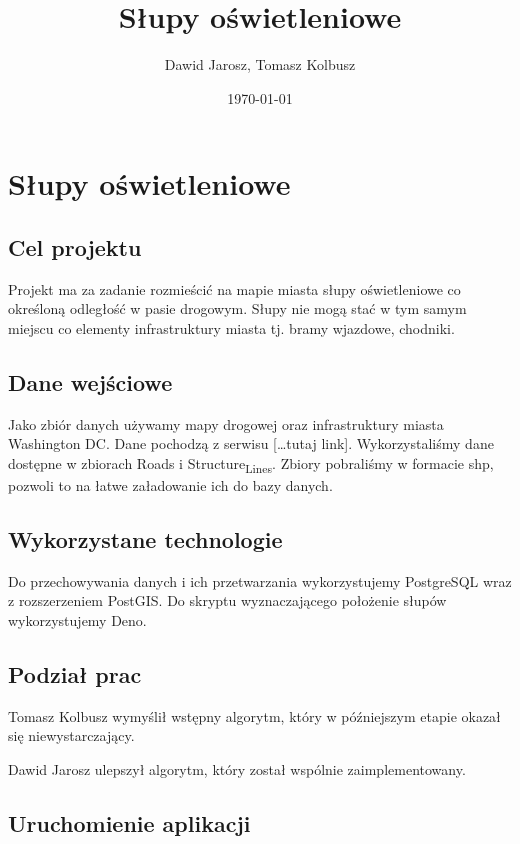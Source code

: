\documentclass[11pt]{article}
\author{Dawid Jarosz, Tomasz Kolbusz}
\date{\today}
\title{Słupy oświetleniowe}
\begin{document}
\maketitle
\tableofcontents


\section{Słupy oświetleniowe}
\label{sec:orgee6b79e}

\subsection{Cel projektu}
\label{sec:org1f6cad9}
Projekt ma za zadanie rozmieścić na mapie miasta słupy oświetleniowe co określoną odległość w pasie drogowym. Słupy nie mogą stać w tym samym miejscu co elementy infrastruktury miasta tj. bramy wjazdowe, chodniki.

\subsection{Dane wejściowe}
\label{sec:org153bbda}

Jako zbiór danych używamy mapy drogowej oraz infrastruktury miasta Washington DC. Dane pochodzą z serwisu [\ldots{}tutaj link]. Wykorzystaliśmy dane dostępne w zbiorach Roads i Structure\textsubscript{Lines}. Zbiory pobraliśmy w formacie shp, pozwoli to na łatwe załadowanie ich do bazy danych.

\subsection{Wykorzystane technologie}
\label{sec:org72fceea}

Do przechowywania danych i ich przetwarzania wykorzystujemy PostgreSQL wraz z rozszerzeniem PostGIS. Do skryptu wyznaczającego położenie słupów wykorzystujemy Deno.

\subsection{Podział prac}
\label{sec:org0b931df}

Tomasz Kolbusz wymyślił wstępny algorytm, który w późniejszym etapie okazał się niewystarczający.

Dawid Jarosz ulepszył algorytm, który został wspólnie zaimplementowany.

\subsection{Uruchomienie aplikacji}
\label{sec:orgbc75384}
\end{document}
